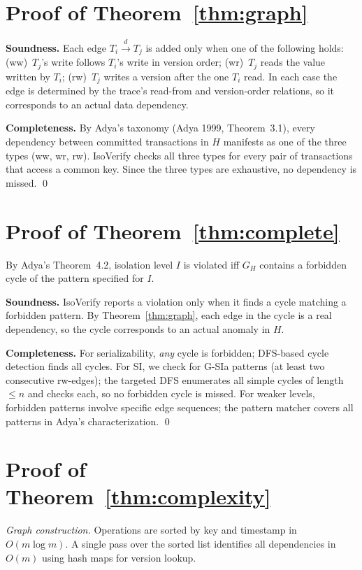 \documentclass[11pt]{article}
\begin{document}
\appendix
\section{Proof of Theorem~\ref{thm:graph}}
\label{app:graph}

\textbf{Soundness.}  Each edge $T_i \xrightarrow{d} T_j$ is added only when
one of the following holds: (ww)~$T_j$'s write follows $T_i$'s write in
version order; (wr)~$T_j$ reads the value written by $T_i$; (rw)~$T_j$
writes a version after the one $T_i$ read.  In each case the edge is
determined by the trace's read-from and version-order relations, so it
corresponds to an actual data dependency.

\textbf{Completeness.}  By Adya's taxonomy (Adya 1999, Theorem~3.1), every
dependency between committed transactions in $H$ manifests as one of the
three types (ww, wr, rw).  IsoVerify checks all three types for every pair of
transactions that access a common key.  Since the three types are exhaustive,
no dependency is missed.  \qed

\section{Proof of Theorem~\ref{thm:complete}}
\label{app:complete}

By Adya's Theorem~4.2, isolation level $I$ is violated iff $G_H$ contains a
forbidden cycle of the pattern specified for $I$.

\textbf{Soundness.}  IsoVerify reports a violation only when it finds a cycle
matching a forbidden pattern.  By Theorem~\ref{thm:graph}, each edge in the
cycle is a real dependency, so the cycle corresponds to an actual anomaly in
$H$.

\textbf{Completeness.}  For serializability, \emph{any} cycle is forbidden;
DFS-based cycle detection finds all cycles.  For SI, we check for G-SIa
patterns (at least two consecutive rw-edges); the targeted DFS enumerates all
simple cycles of length $\leq n$ and checks each, so no forbidden cycle is
missed.  For weaker levels, forbidden patterns involve specific edge
sequences; the pattern matcher covers all patterns in Adya's
characterization.  \qed

\section{Proof of Theorem~\ref{thm:complexity}}
\label{app:complexity}

\emph{Graph construction.}  Operations are sorted by key and timestamp in
$O(m \log m)$.  A single pass over the sorted list identifies all
dependencies in $O(m)$ using hash maps for version lookup.
\end{document}
